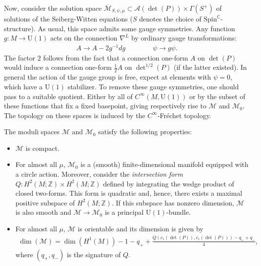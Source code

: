     Now, consider the solution space $\overline{\mathcal{M}}_{S,\psi,\mu}\subset\mathcal{A}(\det(P))\times\Gamma(S^+)$ of solutions of the Seiberg-Witten equations ($S$ denotes the choice of $\mathrm{Spin}^\mathbb{C}$-structure). As usual, this space admits some gauge symmetries. Any function $g:M\rightarrow\mathrm{U}(1)$ acts on the connection $\nabla^L$ by ordinary gauge transformations:
    \begin{gather}
        A\longrightarrow A-2g^{-1}dg\qquad\qquad\psi\longrightarrow g\psi.
    \end{gather}
    The factor 2 follows from the fact that a connection one-form $A$ on $\det(P)$ would induce a connection one-form $\frac{1}{2}A$ on $\det^{1/2}(P)$ (if the latter existed). In general the action of the gauge group is free, expect at elements with $\psi=0$, which have a $\mathrm{U}(1)$ stabilizer. To remove these gauge symmetries, one should pass to a suitable quotient. Either by all of $C^\infty(M,\mathrm{U}(1))$ or by the subset of these functions that fix a fixed basepoint, giving respectively rise to $\mathcal{M}$ and $\mathcal{M}_0$. The topology on these spaces is induced by the $C^\infty$-Fr\'echet topology.

    \begin{property}
        The moduli spaces $\mathcal{M}$ and $\mathcal{M}_0$ satisfy the following properties:
        \begin{itemize}
            \item $\mathcal{M}$ is compact.
            \item For almost all $\mu$, $\mathcal{M}_0$ is a (smooth) finite-dimensional manifold equipped with a circle action. Moreover, consider the \textit{intersection form} $Q:H^2(M;\mathbb{Z})\times H^2(M;\mathbb{Z})$ defined by integrating the wedge product of closed two-forms. This form is quadratic and, hence, there exists a maximal positive subspace of $H^2(M;\mathbb{Z})$. If this subspace has nonzero dimension, $\mathcal{M}$ is also smooth and $\mathcal{M}\rightarrow\mathcal{M}_0$ is a principal $\mathrm{U}(1)$-bundle.
            \item For almost all $\mu$, $\mathcal{M}$ is orientable and its dimension is given by
                \begin{gather}
                    \dim(\mathcal{M}) = \dim(H^1(M)) - 1 - q_+ + \frac{Q(c_1(\det(P)),c_1(\det(P)))-q_++q_-}{4},
                \end{gather}
                where $(q_+,q_-)$ is the signature of $Q$.
        \end{itemize}
    \end{property}

